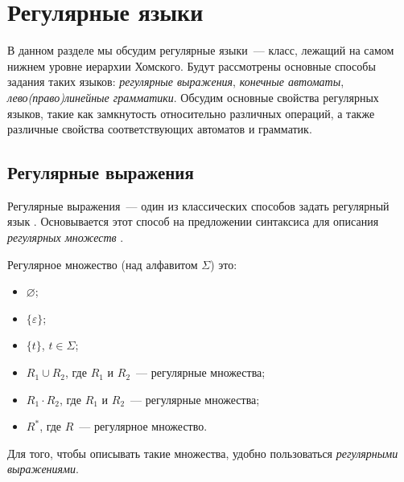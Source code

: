 \setchapterpreamble[u]{\margintoc}
\chapter{Регулярные языки}

В данном разделе мы обсудим регулярные языки~--- класс, лежащий на самом нижнем уровне иерархии Хомского.
Будут рассмотрены основные способы задания таких языков: \emph{регулярные выражения}, \emph{конечные автоматы}, \emph{лево(право)линейные грамматики}.
Обсудим основные свойства регулярных языков, такие как замкнутость относительно различных операций, а также различные свойства соответствующих автоматов и грамматик.

\section{Регулярные выражения}

Регулярные выражения~--- один из классических способов задать регулярный язык%
.
Основывается этот способ на предложении синтаксиса для описания \emph{регулярных множеств}%
.

\begin{definition}
    Регулярное множество (над алфавитом $\Sigma$) это:
    \begin{itemize}
        \item $\varnothing$;
        \item $\{\varepsilon\}$;
        \item $\{t\}$, $t \in \Sigma$;
        \item $R_1 \cup R_2$, где $R_1$ и $R_2$~--- регулярные множества;
        \item $R_1 \cdot R_2$, где $R_1$ и $R_2$~--- регулярные множества;
        \item $R^*$, где $R$~--- регулярное множество.
    \end{itemize}
\end{definition}

Для того, чтобы описывать такие множества, удобно пользоваться \emph{регулярными выражениями}.

